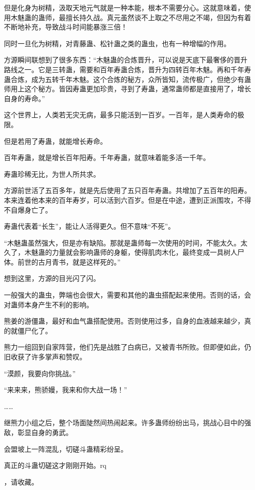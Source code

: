 \begin{this_body}
但是化身为树精，汲取天地元气就是一种本能，根本不需要分心。这就意味着，使用木魅蛊的蛊师，最擅长持久战。真元虽然谈不上取之不尽用之不竭，但因为有着不断地补充，导致战斗时间能暴涨三倍！

同时一旦化为树精，对青藤蛊、松针蛊之类的蛊虫，也有一种增幅的作用。

方源瞬间联想到了很多东西：“木魅蛊的合炼晋升，可以说是天底下最奢侈的晋升路线之一。它是三转蛊，需要和百年寿蛊合炼，晋升为四转百年木魅。再和千年寿蛊合炼，成为五转千年木魅。这个合炼的秘方，众所皆知，流传极广，但绝少有蛊师用上这个秘方。皆因寿蛊更加珍贵，寻到了寿蛊，通常蛊师都是直接用了，增长自身的寿命。”

这个世界上，人类若无灾无病，最多只能活到一百岁。一百年，是人类寿命的极限。

但是若用了寿蛊，就能增长寿命。

百年寿蛊，就是增长百年阳寿。千年寿蛊，就意味着能多活一千年。

寿蛊珍稀无比，为世人所共求。

方源前世活了五百多年，就是先后使用了五只百年寿蛊。共增加了五百年的阳寿。本来连着他本来的百年寿岁，可以活到六百岁。但是在中途，遭到正派围攻，不得不自爆身亡了。

寿蛊代表着“长生”，能让人活得更久。但不意味“不死”。

“木魅蛊虽然强大，但是亦有缺陷。那就是蛊师每一次使用的时间，不能太久。太久了，木魅蛊的力量就会影响蛊师的身躯，使得肌肉木化，最终变成一具树人尸体。前世的古月青书，就是这样死的。”

想到这里，方源的目光闪了闪。

一般强大的蛊虫，弊端也会很大，需要和其他的蛊虫搭配起来使用。否则的话，会对蛊师本身产生不利的影响。

熊姜的游僵蛊，最好和血气蛊搭配使用。否则使用过多，自身的血液越来越少，真的就僵尸化了。

熊力一组回到自家阵营，他们先是战胜了白病已，又被青书所败。但即便如此，仍旧收获了许多掌声和赞叹。

“漠颜，我要向你挑战。”

“来来来，熊骄嫚，我来和你大战一场！”

……

继熊力小组之后，整个场面陡然间热闹起来。许多蛊师纷纷出马，挑战心目中的强敌，彰显自身的勇武。

会盟坡上一阵混乱，切磋斗蛊精彩纷呈。

真正的斗蛊切磋这才刚刚开始。rq

，请收藏。

\end{this_body}

